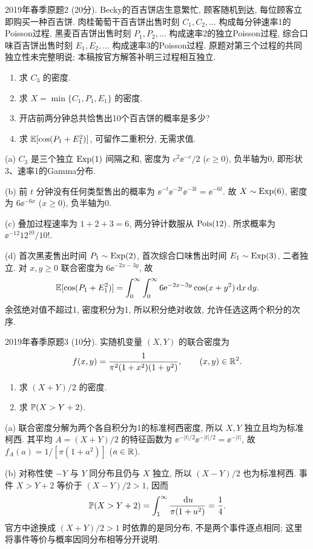 \begin{exercise}\label{m2:2019s:q2}
2019年春季原题2 (20分). Becky的百吉饼店生意繁忙, 顾客随机到达, 每位顾客立即购买一种百吉饼. 肉桂葡萄干百吉饼出售时刻 $C_1,C_2,\ldots$ 构成每分钟速率1的Poisson过程, 黑麦百吉饼出售时刻 $P_1,P_2,\ldots$ 构成速率2的独立Poisson过程, 综合口味百吉饼出售时刻 $E_1,E_2,\ldots$ 构成速率3的Poisson过程. 原题对第三个过程的共同独立性未完整明说; 本稿按官方解答补明三过程相互独立.
\begin{enumerate}
\item[(a)]\label{m2:2019s:q2:a} 求 $C_3$ 的密度.
\item[(b)]\label{m2:2019s:q2:b} 求 $X=\min\{C_1,P_1,E_1\}$ 的密度.
\item[(c)]\label{m2:2019s:q2:c} 开店前两分钟总共恰售出10个百吉饼的概率是多少?
\item[(d)]\label{m2:2019s:q2:d} 求 $\mathbb E[\cos(P_1+E_1^2)]$, 可留作二重积分, 无需求值.
\end{enumerate}
\end{exercise}
\begin{solution}
(a) $C_3$ 是三个独立 $\operatorname{Exp}(1)$ 间隔之和, 密度为 $c^2\ee^{-c}/2$ ($c\ge0$), 负半轴为0, 即形状3、速率1的Gamma分布.

(b) 前 $t$ 分钟没有任何类型售出的概率为 $\ee^{-t}\ee^{-2t}\ee^{-3t}=\ee^{-6t}$. 故 $X\sim\operatorname{Exp}(6)$, 密度为 $6\ee^{-6x}$ ($x\ge0$), 负半轴为0.

(c) 叠加过程速率为 $1+2+3=6$, 两分钟计数服从 $\operatorname{Pois}(12)$. 所求概率为 $\ee^{-12}12^{10}/10!$.

(d) 首次黑麦售出时间 $P_1\sim\operatorname{Exp}(2)$, 首次综合口味售出时间 $E_1\sim\operatorname{Exp}(3)$, 二者独立. 对 $x,y\ge0$ 联合密度为 $6\ee^{-2x-3y}$, 故
\[
\mathbb E[\cos(P_1+E_1^2)]=\int_0^\infty\int_0^\infty6\mathrm e^{-2x-3y}\cos(x+y^2)\,\mathrm d x\,\mathrm d y.
\]
余弦绝对值不超过1, 密度积分为1, 所以积分绝对收敛, 允许任选这两个积分的次序.
\end{solution}

\begin{exercise}\label{m2:2019s:q3}
2019年春季原题3 (10分). 实随机变量 $(X,Y)$ 的联合密度为
\[
f(x,y)=\frac1{\pi^2(1+x^2)(1+y^2)},\qquad(x,y)\in\mathbb R^2.
\]
\begin{enumerate}
\item[(a)]\label{m2:2019s:q3:a} 求 $(X+Y)/2$ 的密度.
\item[(b)]\label{m2:2019s:q3:b} 求 $\mathbb P(X>Y+2)$.
\end{enumerate}
\end{exercise}
\begin{solution}
(a) 联合密度分解为两个各自积分为1的标准柯西密度, 所以 $X,Y$ 独立且均为标准柯西. 其平均 $A=(X+Y)/2$ 的特征函数为 $\ee^{-|t|/2}\ee^{-|t|/2}=\ee^{-|t|}$, 故 $f_A(a)=1/[\pi(1+a^2)]$ ($a\in\mathbb R$).

(b) 对称性使 $-Y$ 与 $Y$ 同分布且仍与 $X$ 独立, 所以 $(X-Y)/2$ 也为标准柯西. 事件 $X>Y+2$ 等价于 $(X-Y)/2>1$, 因而
\[
\mathbb P(X>Y+2)=\int_1^\infty\frac{\,\mathrm d u}{\pi(1+u^2)}=\frac14.
\]
官方中途换成 $(X+Y)/2>1$ 时依靠的是同分布, 不是两个事件逐点相同; 这里将事件等价与概率因同分布相等分开说明.
\end{solution}

